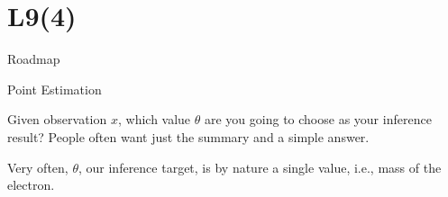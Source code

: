 \section{L9(4)}
\begin{frame}{Roadmap}

\plitemsep 0.15in

\bce[(1)]

\item {}

\item {}

\item {}

\item {}

\item {}



  
  \ece

\end{frame}



\begin{frame}{Point Estimation}

\vspace{-0.9cm}

\plitemsep 0.1in
\bci

\item<2-> 
\bci

\item   Given observation $x$, which  value $\theta$ are you
  going to choose as your inference result? People often want just the
  summary and a simple answer. 

\item Very often, $\theta$, our inference target, is by nature a
  single value, i.e., mass of the electron. 
  \eci


  \eci

\end{frame}



